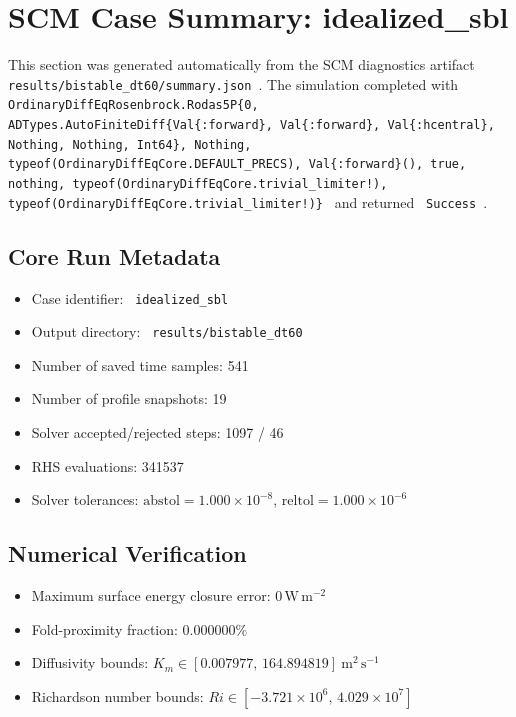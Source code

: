 \section{SCM Case Summary: idealized\_sbl}
\label{sec:scm_case_idealized_sbl}

This section was generated automatically from the SCM diagnostics artifact
\texttt{ results/bistable\_dt60/summary.json }. The simulation completed with \texttt{ OrdinaryDiffEqRosenbrock.Rodas5P\{0, ADTypes.AutoFiniteDiff\{Val\{:forward\}, Val\{:forward\}, Val\{:hcentral\}, Nothing, Nothing, Int64\}, Nothing, typeof(OrdinaryDiffEqCore.DEFAULT\_PRECS), Val\{:forward\}(), true, nothing, typeof(OrdinaryDiffEqCore.trivial\_limiter!), typeof(OrdinaryDiffEqCore.trivial\_limiter!)\} }
and returned \texttt{ Success }.

\subsection{Core Run Metadata}
\begin{itemize}
  \item Case identifier: \texttt{ idealized\_sbl }
  \item Output directory: \texttt{ results/bistable\_dt60 }
  \item Number of saved time samples: 541
  \item Number of profile snapshots: 19
  \item Solver accepted/rejected steps: 1097 / 46
  \item RHS evaluations: 341537
  \item Solver tolerances: $\mathrm{abstol}=1.000 \times 10^{-8}$, $\mathrm{reltol}=1.000 \times 10^{-6}$
\end{itemize}

\subsection{Numerical Verification}
\begin{itemize}
  \item Maximum surface energy closure error:
  $0\,\mathrm{W\,m^{-2}}$
  \item Fold-proximity fraction:
  $0.000000\%$
  \item Diffusivity bounds:
  $K_m \in [0.007977,\,164.894819]~\mathrm{m^2\,s^{-1}}$
  \item Richardson number bounds:
  $Ri \in [-3.721 \times 10^{6},\,4.029 \times 10^{7}]$
\end{itemize}

